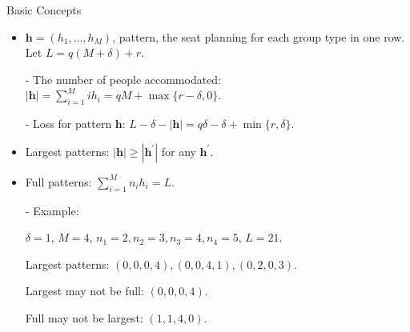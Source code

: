   \begin{frame}{Basic Concepts}
    \begin{itemize}
      \item $\bm{h} = (h_1, \ldots, h_M)$, pattern, the seat planning for each group type in one row.
      Let $L = q(M + \delta) + r$.

      - The number of people accommodated: $|\bm{h}| = \sum_{i =1}^{M} i h_i = qM + \max\{r-\delta, 0\}$.
      
      - Loss for pattern $\bm{h}$: $L- \delta - |\bm{h}| = q \delta - \delta + \min\{r, \delta\}$.
      \item Largest patterns: $|\bm{h}| \geq |\bm{h}^{\prime}|$ for any $\bm{h}^{\prime}$. 
      \item Full patterns: $\sum_{i=1}^{M} n_i h_i = L$.
      \item[-] {\color{blue} Example}: 
      
      $\delta = 1$, $M =4$, $n_1 = 2, n_2 = 3, n_3 = 4, n_4 = 5$, $L = 21$.
      
      Largest patterns: $(0, 0, 0, 4), (0, 0, 4, 1), (0, 2, 0, 3)$.

      Largest may not be full: $(0, 0, 0, 4)$.

      Full may not be largest: $(1, 1, 4, 0)$.
    \end{itemize}
  \end{frame}

